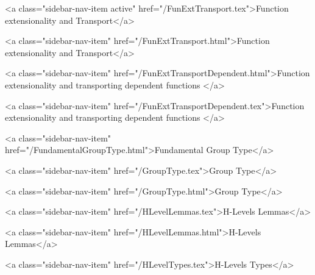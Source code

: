       
    
      
        
          <a class="sidebar-nav-item active" href="/FunExtTransport.tex">Function extensionality and Transport</a>
        
      
    
      
        
          <a class="sidebar-nav-item" href="/FunExtTransport.html">Function extensionality and Transport</a>
        
      
    
      
        
          <a class="sidebar-nav-item" href="/FunExtTransportDependent.html">Function extensionality and transporting dependent functions </a>
        
      
    
      
        
          <a class="sidebar-nav-item" href="/FunExtTransportDependent.tex">Function extensionality and transporting dependent functions </a>
        
      
    
      
        
          <a class="sidebar-nav-item" href="/FundamentalGroupType.html">Fundamental Group Type</a>
        
      
    
      
        
          <a class="sidebar-nav-item" href="/GroupType.tex">Group Type</a>
        
      
    
      
        
          <a class="sidebar-nav-item" href="/GroupType.html">Group Type</a>
        
      
    
      
        
          <a class="sidebar-nav-item" href="/HLevelLemmas.tex">H-Levels Lemmas</a>
        
      
    
      
        
          <a class="sidebar-nav-item" href="/HLevelLemmas.html">H-Levels Lemmas</a>
        
      
    
      
        
          <a class="sidebar-nav-item" href="/HLevelTypes.tex">H-Levels Types</a>
        
      
    
